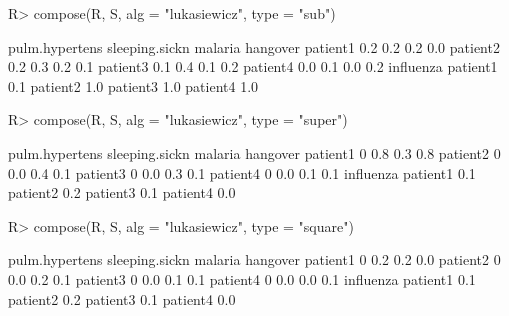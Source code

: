 \begin{Schunk}
% --begin: "comp.subsupsquare"
\begin{Sinput}
R> compose(R, S, alg = "lukasiewicz", type = "sub")
\end{Sinput}
\begin{Soutput}
         pulm.hypertens sleeping.sickn malaria hangover
patient1            0.2            0.2     0.2      0.0
patient2            0.2            0.3     0.2      0.1
patient3            0.1            0.4     0.1      0.2
patient4            0.0            0.1     0.0      0.2
         influenza
patient1       0.1
patient2       1.0
patient3       1.0
patient4       1.0
\end{Soutput}
\begin{Sinput}
R> compose(R, S, alg = "lukasiewicz", type = "super")
\end{Sinput}
\begin{Soutput}
         pulm.hypertens sleeping.sickn malaria hangover
patient1              0            0.8     0.3      0.8
patient2              0            0.0     0.4      0.1
patient3              0            0.0     0.3      0.1
patient4              0            0.0     0.1      0.1
         influenza
patient1       0.1
patient2       0.2
patient3       0.1
patient4       0.0
\end{Soutput}
\begin{Sinput}
R> compose(R, S, alg = "lukasiewicz", type = "square")
\end{Sinput}
\begin{Soutput}
         pulm.hypertens sleeping.sickn malaria hangover
patient1              0            0.2     0.2      0.0
patient2              0            0.0     0.2      0.1
patient3              0            0.0     0.1      0.1
patient4              0            0.0     0.0      0.1
         influenza
patient1       0.1
patient2       0.2
patient3       0.1
patient4       0.0
\end{Soutput}
%
% --end: "comp.subsupsquare"
\end{Schunk}
